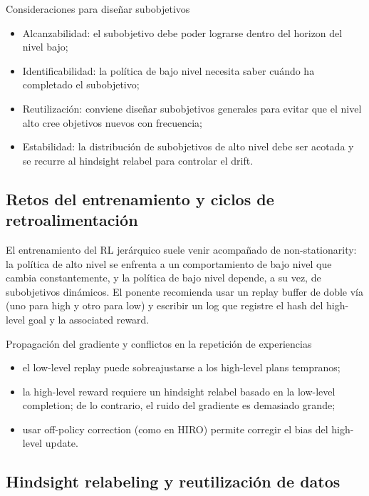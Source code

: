 \documentclass[a4paper]{article}
\begin{document}
\begin{knowledgebox}{Consideraciones para diseñar subobjetivos}
\begin{itemize}
    \item Alcanzabilidad: el subobjetivo debe poder lograrse dentro del horizon del nivel bajo;
    \item Identificabilidad: la política de bajo nivel necesita saber cuándo ha completado el subobjetivo;
    \item Reutilización: conviene diseñar subobjetivos generales para evitar que el nivel alto cree objetivos nuevos con frecuencia;
    \item Estabilidad: la distribución de subobjetivos de alto nivel debe ser acotada y se recurre al hindsight relabel para controlar el drift.
\end{itemize}
\end{knowledgebox}

\subsection{Retos del entrenamiento y ciclos de retroalimentación}

El entrenamiento del RL jerárquico suele venir acompañado de non-stationarity: la política de alto nivel se enfrenta a un comportamiento de bajo nivel que cambia constantemente, y la política de bajo nivel depende, a su vez, de subobjetivos dinámicos. El ponente recomienda usar un replay buffer de doble vía (uno para high y otro para low) y escribir un log que registre el hash del high-level goal y la associated reward.

\begin{warningbox}{Propagación del gradiente y conflictos en la repetición de experiencias}
\begin{itemize}
    \item el low-level replay puede sobreajustarse a los high-level plans tempranos;
    \item la high-level reward requiere un hindsight relabel basado en la low-level completion; de lo contrario, el ruido del gradiente es demasiado grande;
    \item usar off-policy correction (como en HIRO) permite corregir el bias del high-level update.
\end{itemize}
\end{warningbox}

\subsection{Hindsight relabeling y reutilización de datos}
\end{document}
